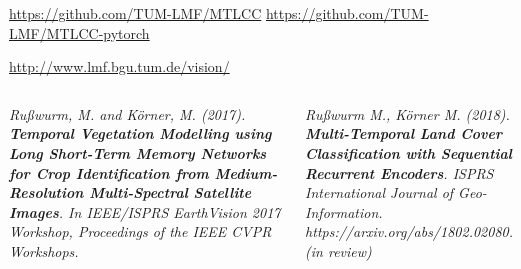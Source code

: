 \begin{frame}[c]
\vspace{1ex}

\url{https://github.com/TUM-LMF/MTLCC}
\url{https://github.com/TUM-LMF/MTLCC-pytorch}

\url{http://www.lmf.bgu.tum.de/vision/}

\vspace{1em}
\begin{columns}[t]
	\scriptsize
	\textsl{
		Rußwurm, M. and Körner, M. (2017). \textbf{Temporal Vegetation Modelling using Long Short-Term Memory Networks for Crop Identification from Medium-Resolution Multi-Spectral Satellite Images}. In IEEE/ISPRS EarthVision 2017 Workshop, Proceedings of the IEEE CVPR Workshops.
	}
	
	\small
	\textsl{
		Rußwurm M., Körner M. (2018). \textbf{Multi-Temporal Land Cover Classification with Sequential Recurrent Encoders}. ISPRS International Journal of Geo-Information. https://arxiv.org/abs/1802.02080. (in review)
	}
	
\end{columns}


\end{frame}

